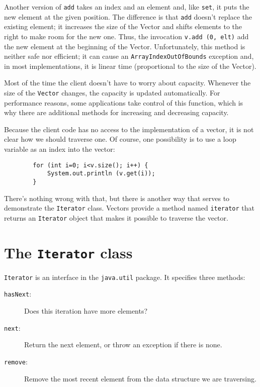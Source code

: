 Another version of {\tt add}
takes an index and an element and, like {\tt set}, it puts
the new element at the given position.  The difference is
that {\tt add} doesn't replace the existing element; it
increases the size of the Vector and shifts elements to the
right to make room for the new one.  Thus, the invocation
{\tt v.add (0, elt)} add the new element at the beginning
of the Vector.  Unfortunately, this method is neither
safe nor efficient; it can cause an {\tt ArrayIndexOutOfBounds}
exception and, in most implementations, it is linear time
(proportional to the size of the Vector).

Most of the time the client doesn't have to worry about
capacity.  Whenever the size of the {\tt Vector} changes,
the capacity is updated automatically.
For performance reasons, some applications take
control of this function, which is why there are additional methods
for increasing and decreasing capacity.

Because the client code has no access to the implementation of
a vector, it is not clear how we should traverse one.  Of course,
one possibility is to use a loop variable as an index into the
vector:

\begin{verbatim}
        for (int i=0; i<v.size(); i++) {
            System.out.println (v.get(i));
        }
\end{verbatim}
%
There's nothing wrong with that, but there is another way that
serves to demonstrate the {\tt Iterator} class.  Vectors provide
a method named {\tt iterator} that returns an {\tt Iterator} object
that makes it possible to traverse the vector.


\section {The {\tt Iterator} class}
\label{iterator}

{\tt Iterator} is an interface in the {\tt java.util}
package.  It specifies three methods:

\begin{description}

\item [{\tt hasNext}:] Does this iteration have more elements?

\item [{\tt next}:] Return the next element, or throw an exception if
there is none.

\item [{\tt remove}:] Remove the most recent
element from the data structure we are traversing.

\end{description}

